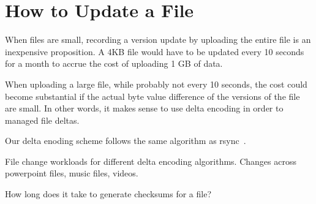 \section{How to Update a File}

When files are small, recording a version update by uploading the
entire file is an inexpensive proposition. A 4KB file would have to be
updated every 10 seconds for a month to accrue the cost of uploading 1
GB of data.

When uploading a large file, while probably not every 10 seconds, the
cost could become substantial if the actual byte value difference of
the versions of the file are small. In other words, it makes sense to
use delta encoding in order to managed file deltas.

Our delta enoding scheme follows the same algorithm as
rsync~\cite{rsync}. 

File change workloads for different delta encoding algorithms. Changes
across powerpoint files, music files, videos.

How long does it take to generate checksums for a file? 

